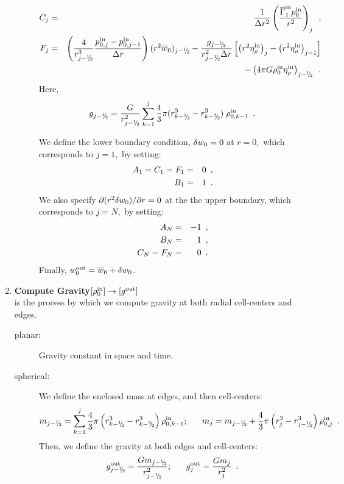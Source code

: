 \begin{enumerate}
\begin{description}
\begin{eqnarray}
C_j &=& \frac{1}{\Delta r^2} \left( \frac{\gammabar^{\inp} p_0^{\inp}}{r^2}\right)_{j}  \enskip, \\
F_j &=&  \left( \frac{4}{r_{j-\myhalf} ^3} \frac{p_{0,j}^{\inp} - p_{0,j-1}^{\inp}}{\dr} \right) (r^2 \ow)_{j-\myhalf}
 - \frac{g_{j-\myhalf}}{r_{j-\myhalf}^2 \Delta r} 
\left[ \left( r^2 \etarho^{\inp} \right)_{j} - \left( r^2 \etarho^{\inp}  \right)_{j-1} \right] 
\nonumber \\
&& - \left(  4 \pi G \rhozero^{\inp} \etarho^{\inp}   \right)_{j-\myhalf} \enskip .
\end{eqnarray}
Here,
\begin{equation}
g_{j-\myhalf} = \frac{G}{r_{j-\myhalf}^2} \sum_{k=1}^{j} \frac{4}{3} \pi  (r_{k-\myhalf}^3 - r_{k-\thalf}^3) \; \rho_{0,k-1}^{\inp} \enskip.
\end{equation}

We define the lower boundary condition, $ \delta w_0 = 0$ at $r=0,$ which
corresponds to $j=1,$ by setting:
\begin{eqnarray}
A_1 = C_1 = F_1 &=& 0\enskip, \nonumber \\
B_1 &=& 1\enskip.
\end{eqnarray}
We also specify $\partial (r^2 \delta w_0) / \partial r = 0$ at the the upper boundary, which corresponds to $j=N,$
by setting:
\begin{eqnarray}
A_N &=& -1\enskip, \nonumber \\
B_N &=&  1\enskip, \nonumber \\
C_N = F_N &=& 0\enskip.
\end{eqnarray}
Finally, $w_0^{\mathrm{out}} = \overline{w}_0 + \delta w_0$.
\end{description}

\item {\bf Compute Gravity}$[\rho_0^{\mathrm{in}}] \rightarrow [g^{\mathrm{out}}]$\\
is the process by which we compute gravity at both radial cell-centers and edges.
\begin{description}
\item [planar:] Gravity constant in space and time.
\item [spherical:] We define the enclosed mass at edges, and then cell-centers:
\begin{equation}
m_{j-\myhalf} = \sum_{k=1}^j \frac{4}{3}\pi\left(r_{k-\myhalf}^3 - r_{k-\sfrac{3}{2}}^3\right)\rho_{0,k-1}^{\inp}; ~~~~~ m_j = m_{j-\myhalf} + \frac{4}{3}\pi \left(r_j^3 - r_{j-\myhalf}^3\right)\rho_{0,j}^{\inp} \enskip .
\end{equation}
Then, we define the gravity at both edges and cell-centers:
\begin{equation}
g_{j-\myhalf}^\outp = \frac{Gm_{j-\myhalf}}{r_{j-\myhalf}^2}; ~~~~~ 
g_j^\outp = \frac{Gm_j}{r_j^2}\enskip .
\end{equation}
\end{description}

\end{enumerate}

